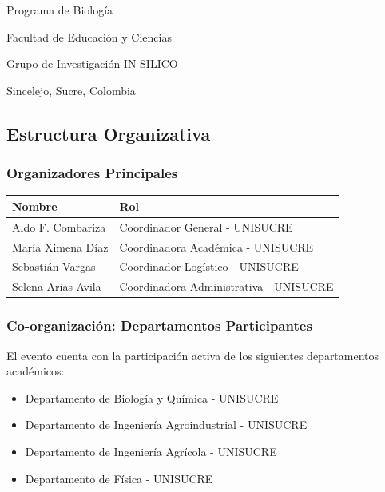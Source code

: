 \documentclass[12pt,a4paper]{article}
\begin{document}
\begin{tcolorbox}[cajainfo, title=Universidad de Sucre]
Programa de Biología

Facultad de Educación y Ciencias

Grupo de Investigación IN SILICO

Sincelejo, Sucre, Colombia
\end{tcolorbox}

\subsection{Estructura Organizativa}

\subsubsection{Organizadores Principales}

\begin{table}[H]
\centering
\begin{tabular}{|p{5cm}|p{10cm}|}
\hline
\rowcolor{verdeclaro}
\textbf{Nombre} & \textbf{Rol} \\
\hline
Aldo F. Combariza & Coordinador General - UNISUCRE \\
\hline
María Ximena Díaz & Coordinadora Académica - UNISUCRE \\
\hline
Sebastián Vargas & Coordinador Logístico - UNISUCRE \\
\hline
Selena Arias Avila & Coordinadora Administrativa - UNISUCRE \\
\hline
\end{tabular}
\end{table}

\subsubsection{Co-organización: Departamentos Participantes}

El evento cuenta con la participación activa de los siguientes departamentos académicos:

\begin{itemize}[label={\textcolor{verdelimpio}{\checkmark}}]
  \item Departamento de Biología y Química - UNISUCRE
  \item Departamento de Ingeniería Agroindustrial - UNISUCRE
  \item Departamento de Ingeniería Agrícola - UNISUCRE
  \item Departamento de Física - UNISUCRE
\end{itemize}
\end{document}
